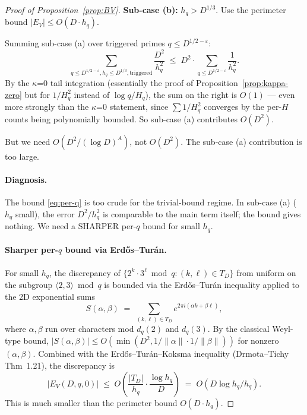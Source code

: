 \begin{proof}[Proof of Proposition~\ref{prop:BV}]
\textbf{Sub-case (b):} $h_{q} > D^{1/3}$. Use the perimeter bound
$|E_{V}| \leq O(D \cdot h_{q})$.

\smallskip

Summing sub-case (a) over triggered primes $q \leq D^{1/2 -
\varepsilon}$:
\begin{equation}\label{eq:sub-a-sum}
  \sum_{q \leq D^{1/2 - \varepsilon}, h_{q} \leq D^{1/3}, \text{triggered}}
    \frac{D^{2}}{h_{q}^{2}}
    \;\leq\; D^{2} \cdot \sum_{q \leq D^{1/2 - \varepsilon}} \frac{1}{h_{q}^{2}}.
\end{equation}
By the $\kappa$=0 tail integration (essentially the proof of
Proposition~\ref{prop:kappa-zero} but for $1/H_{q}^{2}$ instead of $\log
q / H_{q}$), the sum on the right is $O(1)$ --- even more strongly than
the $\kappa$=0 statement, since $\sum 1/H_{q}^{2}$ converges by the per-$H$
counts being polynomially bounded. So sub-case (a) contributes
$O(D^{2})$.

\smallskip

But we need $O(D^{2} / (\log D)^{A})$, not $O(D^{2})$. The sub-case (a)
contribution is too large.

\paragraph{Diagnosis.} The bound \eqref{eq:per-q} is too crude for the
trivial-bound regime. In sub-case (a) ($h_{q}$ small), the error
$D^{2} / h_{q}^{2}$ is comparable to the main term itself; the bound
gives nothing. We need a SHARPER per-$q$ bound for small $h_{q}$.

\paragraph{Sharper per-$q$ bound via Erd\H{o}s--Tur\'an.}
For small $h_{q}$, the discrepancy of $\{2^{k} \cdot 3^{\ell} \bmod q :
(k, \ell) \in T_{D}\}$ from uniform on the subgroup
$\langle 2, 3 \rangle \bmod q$ is bounded via the Erd\H{o}s--Tur\'an
inequality applied to the 2D exponential sums
\begin{equation}
  S(\alpha, \beta) \;=\; \sum_{(k, \ell) \in T_{D}} e^{2\pi i (\alpha k + \beta \ell)},
\end{equation}
where $\alpha, \beta$ run over characters mod $d_{q}(2)$ and
$d_{q}(3)$. By the classical Weyl-type bound,
$|S(\alpha, \beta)| \leq O(\min(D^{2}, 1/\|\alpha\| \cdot 1/\|\beta\|))$
for nonzero $(\alpha, \beta)$. Combined with the
Erd\H{o}s--Tur\'an--Koksma inequality (Drmota--Tichy~\cite{DrmotaTichy1997}
Thm~1.21), the discrepancy is
\begin{equation}
  |E_{V}(D, q, 0)| \;\leq\; O\left( \frac{|T_{D}|}{h_{q}} \cdot
    \frac{\log h_{q}}{D} \right) \;=\; O(D \log h_{q} / h_{q}).
\end{equation}
This is much smaller than the perimeter bound $O(D \cdot h_{q})$.


\end{proof}
